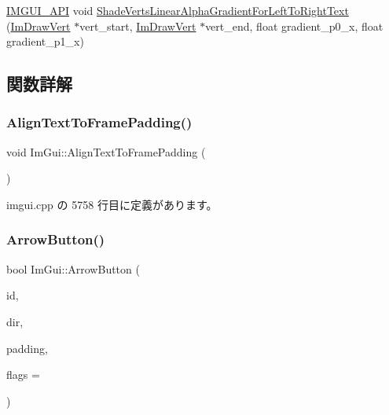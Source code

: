 \begin{DoxyCompactItemize}
\item 
\mbox{\hyperlink{imgui_8h_a43829975e84e45d1149597467a14bbf5}{I\+M\+G\+U\+I\+\_\+\+A\+PI}} void \mbox{\hyperlink{namespace_im_gui_a73b4d230c8fffd2a07d799cd9d4e2a03}{Shade\+Verts\+Linear\+Alpha\+Gradient\+For\+Left\+To\+Right\+Text}} (\mbox{\hyperlink{struct_im_draw_vert}{Im\+Draw\+Vert}} $\ast$vert\+\_\+start, \mbox{\hyperlink{struct_im_draw_vert}{Im\+Draw\+Vert}} $\ast$vert\+\_\+end, float gradient\+\_\+p0\+\_\+x, float gradient\+\_\+p1\+\_\+x)
\end{DoxyCompactItemize}


\subsection{関数詳解}
\mbox{\label{namespace_im_gui_ae14be3a3bec106de7c91aaa2a9a558a1}} 
\subsubsection{\texorpdfstring{Align\+Text\+To\+Frame\+Padding()}{AlignTextToFramePadding()}}
{\footnotesize\ttfamily void Im\+Gui\+::\+Align\+Text\+To\+Frame\+Padding (\begin{DoxyParamCaption}{ }\end{DoxyParamCaption})}



 imgui.\+cpp の 5758 行目に定義があります。

\mbox{\label{namespace_im_gui_ac7c2bd67d2bb2d8ee4b583b1576a0bd3}} 
\subsubsection{\texorpdfstring{Arrow\+Button()}{ArrowButton()}}
{\footnotesize\ttfamily bool Im\+Gui\+::\+Arrow\+Button (\begin{DoxyParamCaption}\item[{\mbox{\hyperlink{imgui_8h_a1785c9b6f4e16406764a85f32582236f}{Im\+Gui\+ID}}}]{id,  }\item[{\mbox{\hyperlink{imgui__internal_8h_a4b8427c5153ae1d43278dc397d809335}{Im\+Gui\+Dir}}}]{dir,  }\item[{\mbox{\hyperlink{struct_im_vec2}{Im\+Vec2}}}]{padding,  }\item[{\mbox{\hyperlink{imgui__internal_8h_a990fae518aa1d95f571ee40989de4c22}{Im\+Gui\+Button\+Flags}}}]{flags = {} }\end{DoxyParamCaption})}



